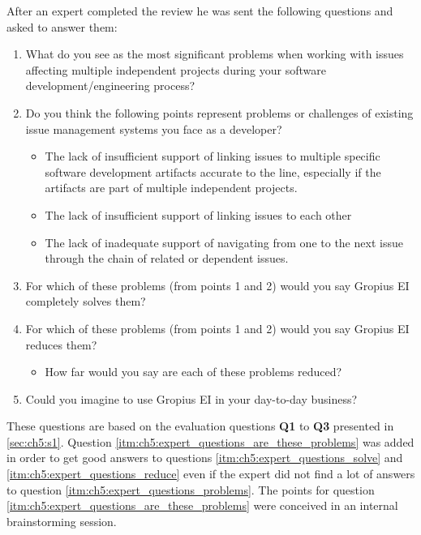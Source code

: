 After an expert completed the review he was sent the following questions and asked to answer them:
\begin{enumerate}
	\item What do you see as the most significant problems when working with issues affecting multiple independent projects during your software development/engineering process? \label{itm:ch5:expert_questions_problems}
	\item Do you think the following points represent problems or challenges of existing issue management systems you face as a developer? \label{itm:ch5:expert_questions_are_these_problems}
	\begin{itemize}
		\item The lack of insufficient support of linking issues to multiple specific software development artifacts accurate to the line, especially if the artifacts are part of multiple independent projects.\label{itm:ch5:expert_questions_are_these_problems_1}
		\item The lack of insufficient support of linking issues to each other \label{itm:ch5:expert_questions_are_these_problems_2}
		\item The lack of inadequate support of navigating from one to the next issue through the chain of related or dependent issues. \label{itm:ch5:expert_questions_are_these_problems_3}
	\end{itemize}
	\item For which of these problems (from points 1 and 2) would you say Gropius EI completely solves them? \label{itm:ch5:expert_questions_solve}
	\item For which of these problems (from points 1 and 2) would you say Gropius EI reduces them? \label{itm:ch5:expert_questions_reduce}
	\begin{itemize}
		\item How far would you say are each of these problems reduced?
	\end{itemize}
	\item Could you imagine to use Gropius EI in your day-to-day business?
\end{enumerate}
These questions are based on the evaluation questions \textbf{Q1} to \textbf{Q3} presented in \cref{sec:ch5:s1}.
Question \ref{itm:ch5:expert_questions_are_these_problems} was added in order to get good answers to questions \ref{itm:ch5:expert_questions_solve} and \ref{itm:ch5:expert_questions_reduce} even if the expert did not find a lot of answers to question \ref{itm:ch5:expert_questions_problems}.
The points for question \ref{itm:ch5:expert_questions_are_these_problems} were conceived in an internal brainstorming session.

